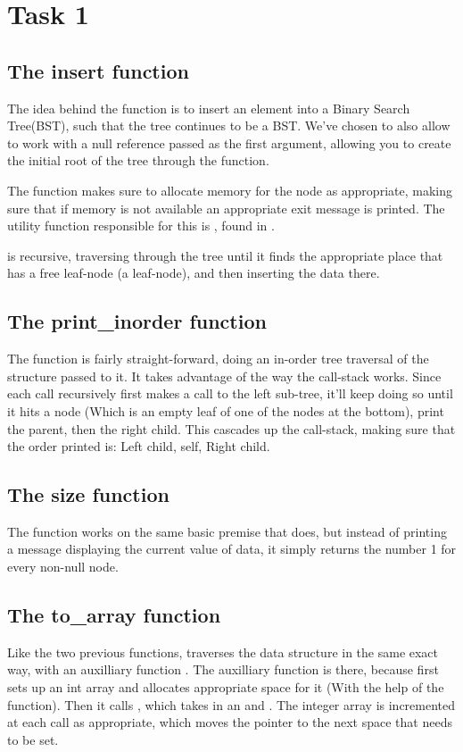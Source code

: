 \section{Task 1}
\subsection{The insert function}
The idea behind the  function is to insert an element into
a Binary Search Tree(BST), such that the tree continues to be a BST. We've
chosen to also allow  to work with a null reference passed as
the first argument, allowing you to create the initial root of the tree through
the function.

The function makes sure to allocate memory for the node as appropriate, making
sure that if memory is not available an appropriate exit message is printed. The
utility function responsible for this is , 
found in .

 is recursive, traversing through the tree until it finds the
appropriate place that has a free leaf-node (a  leaf-node), and
then inserting the data there.

\subsection{The print\_inorder function}
The  function is fairly straight-forward, doing an
in-order tree traversal of the  structure passed to it. It
takes advantage of the way the call-stack works. Since each call recursively
first makes a call to the left sub-tree, it'll keep doing so until it hits a
 node (Which is an empty leaf of one of the nodes at the bottom),
print the parent, then the right child. This cascades up the call-stack, making
sure that the order printed is: Left child, self, Right child.

\subsection{The size function}
The  function works on the same basic premise 
that  does, but instead of printing a message
displaying the current value of data, it simply returns the number 1 for
every non-null node.

\subsection{The to\_array function}
Like the two previous functions,  traverses the data structure
in the same exact way, with an auxilliary function . The
auxilliary function is there, because  first sets up an int array
and allocates appropriate space for it (With the help of the  function).
Then it calls , which takes in an  and
. The integer array is incremented at each call as appropriate, which
moves the pointer to the next space that needs to be set.
